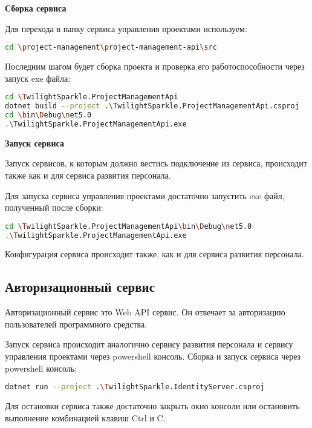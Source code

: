 \bigskip
\textbf{Сборка сервиса}

Для перехода в папку сервиса управления проектами используем:

\begin{lstlisting}[language=bash]
cd \project-management\project-management-api\src
\end{lstlisting}

Последним шагом будет сборка проекта и проверка его работоспособности через запуск exe файла:

\begin{lstlisting}[language=bash]
cd \TwilightSparkle.ProjectManagementApi
dotnet build --project .\TwilightSparkle.ProjectManagementApi.csproj
cd \bin\Debug\net5.0
.\TwilightSparkle.ProjectManagementApi.exe
\end{lstlisting}

\bigskip
\textbf{Запуск сервиса}

Запуск сервисов, к которым должно вестись подключение из сервиса, происходит также как и для сервиса развития персонала.

Для запуска сервиса управления проектами достаточно запустить exe файл, полученный после сборки:

\begin{lstlisting}[language=bash]
cd \TwilightSparkle.ProjectManagementApi\bin\Debug\net5.0
.\TwilightSparkle.ProjectManagementApi.exe
\end{lstlisting}

Конфигурация сервиса происходит также, как и для сервиса развития персонала.


\subsection{Авторизационный сервис}

Авторизационный сервис это Web API сервис. Он отвечает за авторизацию пользователей программного средства.

Запуск сервиса происходит аналогично сервису развития персонала и сервису управления проектами через powershell консоль. Сборка и запуск сервиса через powershell консоль:

\begin{lstlisting}[language=bash]
dotnet run --project .\TwilightSparkle.IdentityServer.csproj
\end{lstlisting}

Для остановки сервиса также достаточно закрыть окно консоли или остановить выполнение комбинацией клавиш Ctrl и C.

